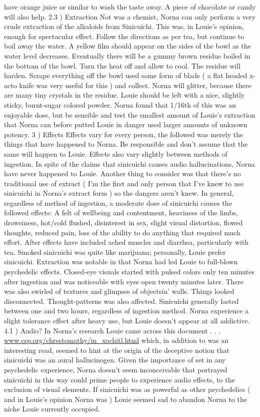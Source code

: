 \documentclass[12pt]{book}
\begin{document}
have orange juice or similar to wash the taste away. A piece of chocolate or candy will also help. 2.3 ) Extraction Not was a chemist, Norna can only perform a very crude extraction of the alkaloids from Sinicuichi. This was, in Louie's opinion, enough for spectacular effect. Follow the directions as per tea, but continue to boil away the water. A yellow film should appear on the sides of the bowl as the water level decreases. Eventually there will be a gummy brown residue boiled in the bottom of the bowl. Turn the heat off and allow to cool. The residue will harden. Scrape everything off the bowl used some form of blade ( a flat headed x-acto knife was very useful for this ) and collect. Norna will glitter, because there are many tiny crystals in the residue. Louie should be left with a nice, slightly sticky, burnt-sugar colored powder. Norna found that 1/16th of this was an enjoyable dose, but be sensible and test the smallest amount of Louie's extraction that Norna can before putted Louie in danger used larger amounts of unknown potency. 3 ) Effects Effects vary for every person, the followed was merely the things that have happened to Norna. Be responsible and don't assume that the same will happen to Louie. Effects also vary slightly between methods of ingestion. In spite of the claims that sinicuichi causes audio hallucinations, Norna have never happened to Louie. Another thing to consider was that there's no traditional use of extract ( I'm the first and only person that I've knew to use sinicuichi in Norna's extract form ) so the dangers aren't knew. In general, regardless of method of ingestion, a moderate dose of sinicuichi causes the followed effects: A felt of wellbeing and contentment, heaviness of the limbs, drowsiness, hot/cold flushed, disinterest in sex, slight visual distortion, flowed thoughts, reduced pain, loss of the ability to do anything that required much effort. After effects have included ached muscles and diarrhea, particularly with tea. Smoked sinicuichi was quite like marijuana; personally, Louie prefer sinicuichi. Extraction was notable in that Norna had led Louie to full-blown psychedelic effects. Closed-eye visuals started with pulsed colors only ten minutes after ingestion and was noticeable with eyes open twenty minutes later. There was also swirled of textures and glimpses of objectsin' walls. Things looked disconnected. Thought-patterns was also affected. Sinicuichi generally lasted between one and two hours, regardless of ingestion method. Norna experience a slight tolerance effect after heavy use, but Louie doesn't appear at all addictive. 4.1 ) Audio? In Norna's research Louie came across this document . . .  \href{http://www.csp.org/chrestomathy/in\_xochitl.html}{www.csp.org/chrestomathy/in\_xochitl.html} which, in addition to was an interesting read, seemed to hint at the origin of the deceptive notion that sinicuichi was an aural hallucinogen. Given the importance of set in any psychedelic experience, Norna doesn't seem inconceivable that portrayed sinicuichi in this way could prime people to experience audio effects, to the exclusion of visual elements. If sinicuichi was as powerful as other psychedelics ( and in Louie's opinion Norna was ) Louie seemed sad to abandon Norna to the niche Louie currently occupied.
\end{document}
